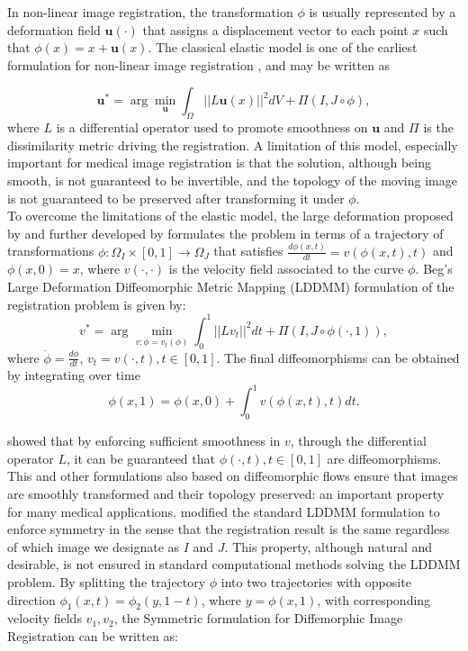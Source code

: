 In non-linear image registration, the transformation $\phi$ is usually represented by a deformation field $\mathbf{u(\cdot)}$ that assigns a displacement vector
to each point $x$ such that $\phi(x) = x + \mathbf{u}(x)$. The classical elastic model is one of the earliest formulation for non-linear image registration \citep{Bajcsy1982, Gee1999},
and may be written as

\begin{equation}\label{eq:elastic}
    \mathbf{u}^{*} = \arg \min_{\mathbf{u}} \int_{\Omega} ||L \mathbf{u}(x)||^{2}dV + \Pi(I, J \circ \phi),
\end{equation}
where $L$ is a differential operator used to promote smoothness on $\mathbf{u}$ and $\Pi$ is the dissimilarity metric driving the registration. A limitation of this model, especially important for medical image registration is that the solution, although being smooth, is not guaranteed to be invertible, and the topology of the moving image is not guaranteed to be preserved after transforming it under $\phi$.\\

To overcome the limitations of the elastic model, the large deformation proposed by \cite{Christensen2001} and further developed by \cite{Science2005} formulates the problem in terms of a trajectory of transformations \hbox{$\phi:\Omega_{I} \times [0, 1] \rightarrow \Omega_{J}$} that satisfies $\frac{d \phi(x, t)}{dt} = v(\phi(x, t), t)$ and $\phi(x, 0) = x$, where $v(\cdot, \cdot)$ is
the velocity field associated to the curve $\phi$. Beg's Large Deformation Diffeomorphic Metric Mapping (LDDMM) \citep{Science2005} formulation of the registration problem is given by:
\begin{equation}\label{eq:LDDMM}
    v^{*} = \arg \min_{v:\dot{\phi} = v_{t}(\phi)} \int_{0}^{1} ||L v_{t}||^{2} dt + \Pi(I, J \circ \phi(\cdot, 1)),
\end{equation}
where $\dot{\phi} = \frac{d\phi}{dt}$, $v_{t} = v(\cdot, t), t\in [0, 1]$. The final diffeomorphisms can be obtained by integrating over time
\begin{equation}\label{eq:velocity_integral}
    \phi(x, 1) = \phi(x, 0) + \int_{0}^{1}v(\phi(x, t), t) dt.
\end{equation}

\cite{Dupuis1998} showed that by enforcing sufficient smoothness in $v$, through the differential operator $L$, it can be guaranteed that $\phi(\cdot, t), t \in [0, 1]$ are diffeomorphisms. This and other formulations also based on diffeomorphic flows ensure that images are smoothly transformed and their topology preserved: an important property for many medical applications. \cite{Avants2008, Avants2011} modified the standard LDDMM formulation to enforce symmetry in the sense that the registration result is the same regardless of which image we designate as $I$ and $J$. This property, although natural and desirable, is not ensured in standard computational methods solving the LDDMM problem. By splitting the trajectory $\phi$ into two trajectories with opposite direction $\phi_{1}(x, t) = \phi_{2}(y, 1-t)$, where $y = \phi(x, 1)$, with corresponding velocity fields $v_{1}, v_{2}$, the Symmetric formulation for Diffemorphic Image Registration \citep{Avants2008, Avants2011} can be written as:

